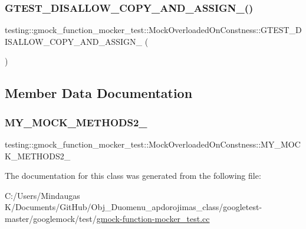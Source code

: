 \subsubsection{\texorpdfstring{GTEST\_DISALLOW\_COPY\_AND\_ASSIGN\_()}{GTEST\_DISALLOW\_COPY\_AND\_ASSIGN\_()}\hspace{0.1cm}{\footnotesize\ttfamily [2/2]}}
{\footnotesize\ttfamily testing\+::gmock\+\_\+function\+\_\+mocker\+\_\+test\+::\+Mock\+Overloaded\+On\+Constness\+::\+G\+T\+E\+S\+T\+\_\+\+D\+I\+S\+A\+L\+L\+O\+W\+\_\+\+C\+O\+P\+Y\+\_\+\+A\+N\+D\+\_\+\+A\+S\+S\+I\+G\+N\+\_\+ (\begin{DoxyParamCaption}\item[{\mbox{\hyperlink{classtesting_1_1gmock__function__mocker__test_1_1_mock_overloaded_on_constness}{Mock\+Overloaded\+On\+Constness}}}]{ }\end{DoxyParamCaption})\hspace{0.3cm}{\ttfamily [private]}}



\subsection{Member Data Documentation}
\mbox{\label{classtesting_1_1gmock__function__mocker__test_1_1_mock_overloaded_on_constness_afb4cd7a26e153426550b9501c7b6c16e}} 
\subsubsection{\texorpdfstring{MY\_MOCK\_METHODS2\_}{MY\_MOCK\_METHODS2\_}}
{\footnotesize\ttfamily testing\+::gmock\+\_\+function\+\_\+mocker\+\_\+test\+::\+Mock\+Overloaded\+On\+Constness\+::\+M\+Y\+\_\+\+M\+O\+C\+K\+\_\+\+M\+E\+T\+H\+O\+D\+S2\+\_\+}



The documentation for this class was generated from the following file\+:\begin{DoxyCompactItemize}
\item 
C\+:/\+Users/\+Mindaugas K/\+Documents/\+Git\+Hub/\+Obj\+\_\+\+Duomenu\+\_\+apdorojimas\+\_\+class/googletest-\/master/googlemock/test/\mbox{\hyperlink{googletest-master_2googlemock_2test_2gmock-function-mocker__test_8cc}{gmock-\/function-\/mocker\+\_\+test.\+cc}}\end{DoxyCompactItemize}
